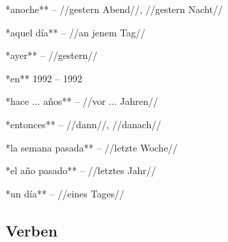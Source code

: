 \begin{compactitem}
    \item **anoche** -- //gestern Abend//, //gestern Nacht//
    \item **aquel día** -- //an jenem Tag//
    \item **ayer** -- //gestern//
    \item **en** 1992 -- 1992
    \item **hace ... años** -- //vor ... Jahren//
    \item **entonces** -- //dann//, //danach//
    \item **la semana pasada** -- //letzte Woche//
    \item **el año pasado** -- //letztes Jahr//
    \item **un día** -- //eines Tages//
\end{compactitem}

\subsection*{Verben}

